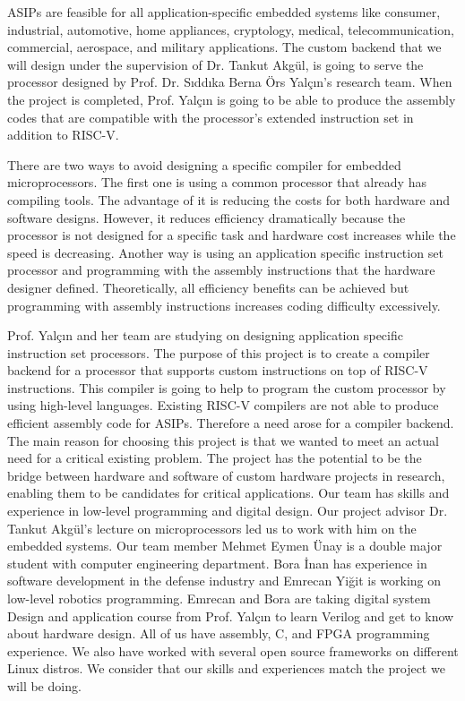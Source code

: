 ASIPs are feasible for all application-specific embedded systems like consumer, industrial, automotive, home appliances, cryptology, medical, telecommunication, commercial, aerospace, and military applications. The custom backend that we will design under the supervision of Dr. Tankut Akgül, is going to serve the processor designed by Prof. Dr. Sıddıka Berna Örs Yalçın’s research team. When the project is completed, Prof. Yalçın is going to be able to produce the assembly codes that are compatible with the processor’s extended instruction set in addition to RISC-V.

There are two ways to avoid designing a specific compiler for embedded microprocessors. The first one is using a common processor that already has compiling tools. The advantage of it is reducing the costs for both hardware and software designs. However, it reduces efficiency dramatically because the processor is not designed for a specific task and hardware cost increases while the speed is decreasing. Another way is using an application specific instruction set processor and programming with the assembly instructions that the hardware designer defined. Theoretically, all efficiency benefits can be achieved but programming with assembly instructions increases coding difficulty excessively.

Prof. Yalçın and her team are studying on designing application specific instruction set processors. The purpose of this project is to create a compiler backend for a processor that supports custom instructions on top of RISC-V instructions. This compiler is going to help to program the custom processor by using high-level languages. Existing RISC-V compilers are not able to produce efficient assembly code for ASIPs. Therefore a need arose for a compiler backend.
The main reason for choosing this project is that we wanted to meet an actual need for a critical existing problem. The project has the potential to be the bridge between hardware and software of custom hardware projects in research, enabling them to be candidates for critical applications. Our team has skills and experience in low-level programming and digital design. Our project advisor Dr. Tankut Akgül’s lecture on microprocessors led us to work with him on the embedded systems. Our team member Mehmet Eymen Ünay is a double major student with computer engineering department. Bora İnan has experience in software development in the defense industry and Emrecan Yiğit is working on low-level robotics programming. Emrecan and Bora are taking digital system Design and application course from Prof. Yalçın to learn Verilog and get to know about hardware design. All of us have assembly, C, and FPGA programming experience. We also have worked with several open source frameworks on different Linux distros. We consider that our skills and experiences match the project we will be doing.

